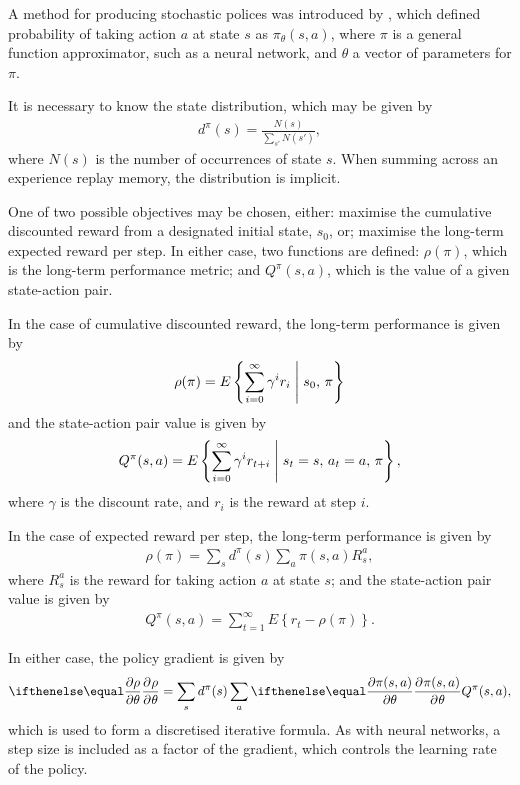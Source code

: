 A method for producing stochastic polices was introduced by
\cite{Sutton:2000:Policy}, which defined probability of taking action $a$ at
state $s$ as $\pi_\theta(s,a)$, where $\pi$ is a general function approximator,
such as a neural network, and $\theta$ a vector of parameters for $\pi$.

It is necessary to know the state distribution, which may be given by
\begin{align*}
    d^\pi(s) = \frac{N(s)}{\sum_{s'} N(s')},
\end{align*}
where $N(s)$ is the number of occurrences of state $s$.
When summing across an experience replay memory, the distribution is implicit.

One of two possible objectives may be chosen, either:
maximise the cumulative discounted reward from a designated initial state,
$s_0$, or;
maximise the long-term expected reward per step.
In either case, two functions are defined:
$\rho(\pi)$, which is the long-term performance metric;
and $Q^\pi(s,a)$, which is the value of a given state-action pair.

In the case of cumulative discounted reward, the long-term performance is given
by
\begin{align*}
    \rho(\pi) = E\left\{
        \sum_{i=0}^{\infty} \gamma^{i}r_{i}
        \;\middle|\; s_0,\, \pi
    \right\}
\end{align*}
and the state-action pair value is given by
\begin{align*}
    Q^\pi(s,a) = E\left\{
        \sum_{i=0}^{\infty} \gamma^{i}r_{t+i}
        \;\middle|\; s_t=s,\, a_t=a,\, \pi
    \right\},
\end{align*}
where $\gamma$ is the discount rate, and $r_i$ is the reward at step $i$.

In the case of expected reward per step, the long-term performance is given by
\begin{align*}
    \rho(\pi) = \sum_s d^\pi(s) \sum_a \pi(s,a) R_s^a,
\end{align*}
where $R_s^a$ is the reward for taking action $a$ at state $s$;
and the state-action pair value is given by
\begin{align*}
    Q^\pi(s,a) = \sum_{t=1}^{\infty} E\left\{
        r_t - \rho(\pi)
    \right\}.
\end{align*}

In either case, the policy gradient is given by
\begin{align*}
    \Rpdiff{\rho}{\theta} =
    \sum_s d^\pi(s)
    \sum_a \Rpdiff{\pi(s,a)}{\theta}
    Q^\pi(s,a),
\end{align*}
which is used to form a discretised iterative formula.
As with neural networks, a step size is included as a factor of the
gradient, which controls the learning rate of the policy.

